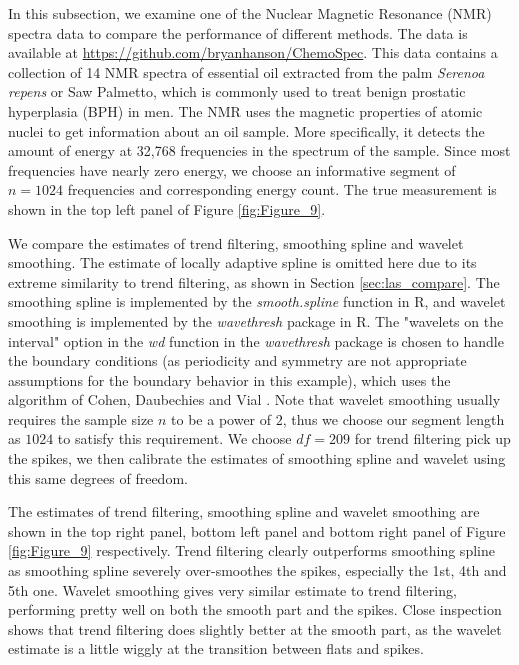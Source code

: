 \documentclass[a4paper]{article}
\begin{document}
In this subsection, we examine one of the Nuclear Magnetic Resonance (NMR) spectra data to compare the performance of different methods. The data is available at \url{https://github.com/bryanhanson/ChemoSpec}. This data contains a collection of 14 NMR spectra of essential oil extracted from the
palm \emph{Serenoa repens} or Saw Palmetto, which is commonly used to treat
benign prostatic hyperplasia (BPH) in men. The NMR uses the magnetic properties of atomic nuclei to get information about an oil sample. More specifically, it detects the amount of energy at 32,768 frequencies in the spectrum of the sample. Since most frequencies have nearly zero energy, we choose an informative segment of $n = 1024$ frequencies and corresponding energy count. The true measurement is shown in the top left panel of Figure \ref{fig:Figure_9}.

We compare the estimates of trend filtering, smoothing spline and wavelet smoothing. The estimate of locally adaptive spline is omitted here due to its extreme similarity to trend filtering, as shown in Section \ref{sec:las_compare}. The smoothing spline is implemented by the \textit{smooth.spline} function in R, and wavelet smoothing is implemented by the \textit{wavethresh} package in R. The "wavelets on the interval" option in the \textit{wd} function in the \textit{wavethresh} package is chosen to handle the boundary conditions (as periodicity and symmetry are not appropriate assumptions for the boundary behavior in this example), which uses the algorithm of Cohen, Daubechies and Vial \cite{cohen1993wavelets}. Note that wavelet smoothing usually requires the sample size $n$ to be a power of $2$, thus we choose our segment length as $1024$ to satisfy this requirement. We choose $df = 209$ for trend filtering pick up the spikes, we then calibrate the estimates of smoothing spline and wavelet using this same degrees of freedom.

The estimates of trend filtering, smoothing spline and wavelet smoothing are shown in the top right panel, bottom left panel and bottom right panel of Figure \ref{fig:Figure_9} respectively. Trend filtering clearly outperforms smoothing spline as smoothing spline severely over-smoothes the spikes, especially the 1st, 4th and 5th one. Wavelet smoothing gives very similar estimate to trend filtering, performing pretty well on both the smooth part and the spikes. Close inspection shows that trend filtering does slightly better at the smooth part, as the wavelet estimate is a little wiggly at the transition between flats and spikes.
\end{document}
